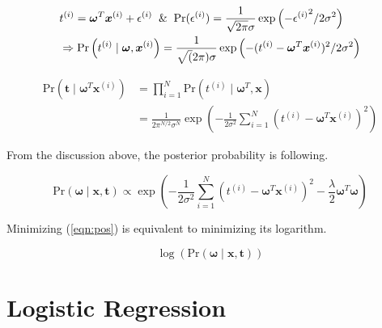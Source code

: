 \documentclass[12pt]{article}
\begin{document}
\begin{align*}
    &t^{(i)} = \boldsymbol{\omega}^T \boldsymbol{x}^{(i)} + \epsilon^{(i)} \And
    \text{Pr}(\epsilon^{(i)}) = \frac{1}{\sqrt{2\pi}\sigma}\exp\left( -{\epsilon^{(i)}}^2/2\sigma^2\right) \\ &\Rightarrow \text{Pr}\left(t^{(i)}\;|\;\boldsymbol{\omega}, \boldsymbol{x}^{(i)}\right) = \frac{1}{\sqrt(2\pi)\sigma} \exp\left(-(t^{(i)} - \boldsymbol{\omega}^T\boldsymbol{x}^{(i)})^2/2\sigma^2\right)
\end{align*}

\begin{align*}
    \text{Pr}(\boldsymbol{t}\;|\; \boldsymbol{\omega}^T \boldsymbol{x}^{(i)}) &= \prod_{i=1}^N\text{Pr}(t^{(i)}\;|\;\boldsymbol{\omega}^T, \boldsymbol{x}) \\ &= \frac{1}{2\pi^{N/2}\sigma^N} \exp\left(-\frac{1}{2\sigma^2}\sum_{i=1}^N (t^{(i)} - \boldsymbol{\omega}^T \boldsymbol{x}^{(i)})^2\right)
\end{align*}

From the discussion above, the posterior probability is following. 

\begin{equation}
    \text{Pr}(\boldsymbol{\omega}\;|\;\boldsymbol{x},\boldsymbol{t}) \propto \exp\left(-\frac{1}{2\sigma^2} \sum_{i=1}^N \left(t^{(i)} - \boldsymbol{\omega}^T\boldsymbol{x}^{(i)} \right)^2 - \frac{\lambda}{2} \boldsymbol{\omega}^T\boldsymbol{\omega}\right)
    \label{eqn:pos}
\end{equation}

Minimizing (\ref{eqn:pos}) is equivalent to minimizing its logarithm.

\begin{equation}
    \log\left(\text{Pr}(\boldsymbol{\omega}\;|\;\boldsymbol{x},\boldsymbol{t})\right)
\end{equation}
\section{Logistic Regression}
\end{document}
